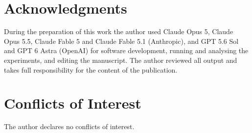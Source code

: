 \documentclass[12pt]{article}
\begin{document}
\section*{Acknowledgments}
During the preparation of this work the author used Claude Opus 5, Claude Opus 5.5, Claude Fable 5 and Claude Fable 5.1 (Anthropic), and GPT 5.6 Sol and GPT 6 Astra (OpenAI) for software development, running and analysing the experiments, and editing the manuscript. The author reviewed all output and takes full responsibility for the content of the publication.

\section*{Conflicts of Interest}
The author declares no conflicts of interest.



\end{document}

